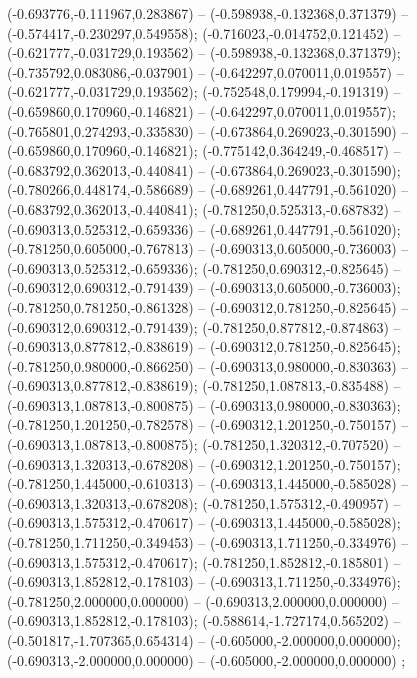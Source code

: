  (-0.693776,-0.111967,0.283867) -- (-0.598938,-0.132368,0.371379) -- (-0.574417,-0.230297,0.549558);
 (-0.716023,-0.014752,0.121452) -- (-0.621777,-0.031729,0.193562) -- (-0.598938,-0.132368,0.371379);
 (-0.735792,0.083086,-0.037901) -- (-0.642297,0.070011,0.019557) -- (-0.621777,-0.031729,0.193562);
 (-0.752548,0.179994,-0.191319) -- (-0.659860,0.170960,-0.146821) -- (-0.642297,0.070011,0.019557);
 (-0.765801,0.274293,-0.335830) -- (-0.673864,0.269023,-0.301590) -- (-0.659860,0.170960,-0.146821);
 (-0.775142,0.364249,-0.468517) -- (-0.683792,0.362013,-0.440841) -- (-0.673864,0.269023,-0.301590);
 (-0.780266,0.448174,-0.586689) -- (-0.689261,0.447791,-0.561020) -- (-0.683792,0.362013,-0.440841);
 (-0.781250,0.525313,-0.687832) -- (-0.690313,0.525312,-0.659336) -- (-0.689261,0.447791,-0.561020);
 (-0.781250,0.605000,-0.767813) -- (-0.690313,0.605000,-0.736003) -- (-0.690313,0.525312,-0.659336);
 (-0.781250,0.690312,-0.825645) -- (-0.690312,0.690312,-0.791439) -- (-0.690313,0.605000,-0.736003);
 (-0.781250,0.781250,-0.861328) -- (-0.690312,0.781250,-0.825645) -- (-0.690312,0.690312,-0.791439);
 (-0.781250,0.877812,-0.874863) -- (-0.690313,0.877812,-0.838619) -- (-0.690312,0.781250,-0.825645);
 (-0.781250,0.980000,-0.866250) -- (-0.690313,0.980000,-0.830363) -- (-0.690313,0.877812,-0.838619);
 (-0.781250,1.087813,-0.835488) -- (-0.690313,1.087813,-0.800875) -- (-0.690313,0.980000,-0.830363);
 (-0.781250,1.201250,-0.782578) -- (-0.690312,1.201250,-0.750157) -- (-0.690313,1.087813,-0.800875);
 (-0.781250,1.320312,-0.707520) -- (-0.690313,1.320313,-0.678208) -- (-0.690312,1.201250,-0.750157);
 (-0.781250,1.445000,-0.610313) -- (-0.690313,1.445000,-0.585028) -- (-0.690313,1.320313,-0.678208);
 (-0.781250,1.575312,-0.490957) -- (-0.690313,1.575312,-0.470617) -- (-0.690313,1.445000,-0.585028);
 (-0.781250,1.711250,-0.349453) -- (-0.690313,1.711250,-0.334976) -- (-0.690313,1.575312,-0.470617);
 (-0.781250,1.852812,-0.185801) -- (-0.690313,1.852812,-0.178103) -- (-0.690313,1.711250,-0.334976);
 (-0.781250,2.000000,0.000000) -- (-0.690313,2.000000,0.000000) -- (-0.690313,1.852812,-0.178103);
 (-0.588614,-1.727174,0.565202) -- (-0.501817,-1.707365,0.654314) -- (-0.605000,-2.000000,0.000000);
 (-0.690313,-2.000000,0.000000) -- (-0.605000,-2.000000,0.000000) ;
